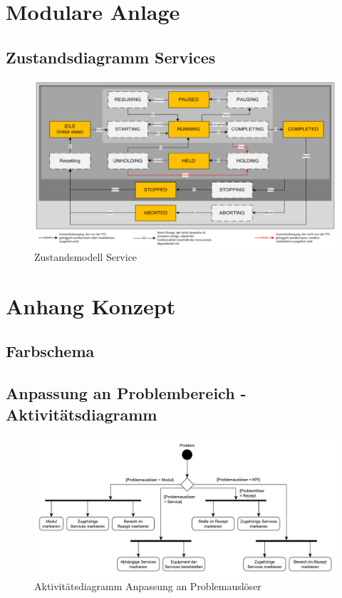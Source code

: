 \chapter{Modulare Anlage}
\section{Zustandsdiagramm Services}

 \begin{figure}[htbp]
 \centering
 \includegraphics[scale=0.6]{DA_files/Bilder/Anhang/Zustandsdiagramm-Services.png}
 \caption{Zustandsmodell Service}
 \end{figure}

\chapter{Anhang Konzept}
\section{Farbschema}

\section{Anpassung an Problembereich - Aktivitätsdiagramm}

\begin{figure}[htbp]
\centering
\includegraphics[angle=90,scale=0.6]{DA_files/UML/Anhang/Aktivitaetsdiagramm-Problem.pdf}
\caption{Aktivitätsdiagramm Anpassung an Problemauslöser}
\end{figure}

